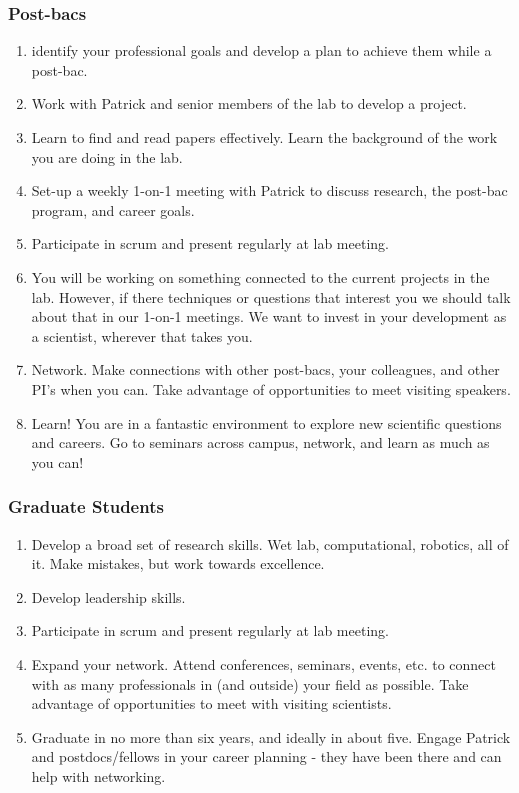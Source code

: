 \documentclass[10pt, letterpaper, twocolumn]{article} %
\begin{document}
\subsubsection{Post-bacs}
\begin{enumerate}
\item identify your professional goals and develop a plan to achieve them while a post-bac.
\item Work with Patrick and senior members of the lab to develop a project.
\item Learn to find and read papers effectively. Learn the background of the work you are doing in the lab.
\item Set-up a weekly 1-on-1 meeting with Patrick to discuss research, the post-bac program, and career goals.
\item Participate in scrum and present regularly at lab meeting.
\item You will be working on something connected to the current projects in the lab. However, if there techniques or questions that interest you we should talk about that in our 1-on-1 meetings. We want to invest in your development as a scientist, wherever that takes you.
\item Network. Make connections with other post-bacs, your colleagues, and other PI's when you can. Take advantage of opportunities to meet visiting speakers.
\item Learn! You are in a fantastic environment to explore new scientific questions and careers. Go to seminars across campus, network, and learn as much as you can!
\end{enumerate}
\subsubsection{Graduate Students}
\begin{enumerate}
\item Develop a broad set of research skills. Wet lab, computational, robotics, all of it. Make mistakes, but work towards excellence.
\item Develop leadership skills.
\item Participate in scrum and present regularly at lab meeting.
\item Expand your network. Attend conferences, seminars, events, etc. to connect with as many professionals in (and outside) your field as possible. Take advantage of opportunities to meet with visiting scientists.
\item Graduate in no more than six years, and ideally in about five. Engage Patrick and postdocs/fellows in your career planning - they have been there and can help with networking.
\end{enumerate}
\end{document}
